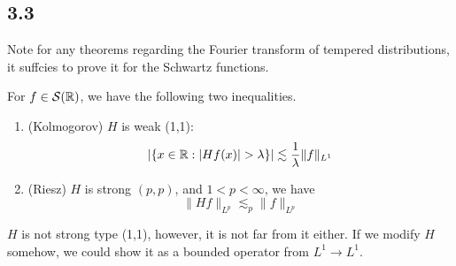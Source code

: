 \subsection{3.3}
Note for any theorems regarding the Fourier transform of tempered distributions, it suffcies to prove it for the Schwartz functions.
\begin{theorem}
    For $f\in\mathcal{S}(\mathbb{R})$, we have the following two inequalities.
    \begin{enumerate}
        \item (Kolmogorov) $H$ is weak (1,1):
        \begin{equation*}
            |\{x\in\R: |Hf(x)|>\lambda\}|\lesssim\frac{1}{\lambda}\|f\|_{L^1}
        \end{equation*}
        \item (Riesz) $H$ is strong $(p,p)$, and $1<p<\infty$, we have
        \begin{equation*}
            \|Hf\|_{L^p}\lesssim_p\|f\|_{L^p}
        \end{equation*}
    \end{enumerate}
\end{theorem}
\begin{note}
    $H$ is not strong type (1,1), however, it is not far from it either. If we modify $H$ somehow, we could show it as a bounded operator from $L^1\to L^1$.
\end{note}
